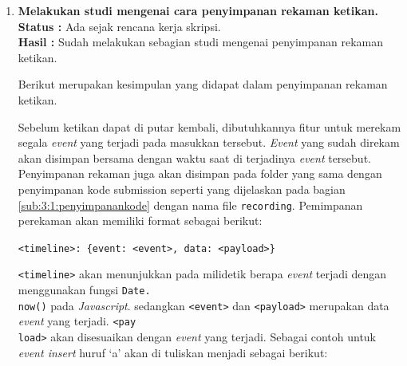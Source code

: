 \documentclass[a4paper,twoside]{article}
\begin{document}
\begin{enumerate}
	      \begin{lstlisting}[language={php}, caption={Contoh template Twig}, label={kode:2:twig}]
{% extends "base.html" %}
{% block navigation %}
	<ul id="navigation">
	{% for item in navigation %}
		<li>
			<a href="{{item.href}}">
				{% if item.level == 2 %}&nbsp;&nbsp;{% endif %}
				{{ item.caption|upper }}
			</a>
		</li>
	{% endfor %}
	</ul>
{% endblock navigation %}
			\end{lstlisting}

	      Kode \ref{kode:2:twig} merupakan contoh sebuah template Twig. Terdapat dua jenis \textit{delimiter}, yaitu \verb|{% ... %}| dan \verb|{{ ... }}|. \textit{Delimiter} \verb|{% ... %}| digunakan untuk Menjalankan sebuah \textit{statement} seperti \textit{for-loops}, sedangkan \textit{delimiter} \verb|{{ ... }}| digunakan untuk mengubah sebuah \textit{variable} atau \textit{expression} menjadi sebuah html biasa dengan nilai \textit{variable} atau \textit{expression} tersebut.


	\item \textbf{Melakukan studi mengenai cara penyimpanan rekaman ketikan.} \\
	      {\bf Status :} Ada sejak rencana kerja skripsi.\\
	      {\bf Hasil :} Sudah melakukan sebagian studi mengenai penyimpanan rekaman ketikan.

	      Berikut merupakan kesimpulan yang didapat dalam penyimpanan rekaman ketikan.

	      Sebelum ketikan dapat di putar kembali, dibutuhkannya fitur untuk merekam segala \textit{event} yang terjadi pada masukkan tersebut. \textit{Event} yang sudah direkam akan disimpan bersama dengan waktu saat di terjadinya \textit{event} tersebut. Penyimpanan rekaman juga akan disimpan pada folder yang sama dengan penyimpanan kode submission seperti yang dijelaskan pada bagian \ref{sub:3:1:penyimpanankode} dengan nama file \verb|recording|. Pemimpanan perekaman akan memiliki format sebagai berikut:

	      \begin{center}
		      \verb|<timeline>: {event: <event>, data: <payload>}|
	      \end{center}

	      \verb|<timeline>| akan menunjukkan pada milidetik berapa \textit{event} terjadi dengan menggunakan fungsi \verb|Date.| \\ \verb|now()| pada \textit{Javascript}. sedangkan \verb|<event>| dan \verb|<payload>| merupakan data \textit{event} yang terjadi. \verb|<pay| \\ \verb|load>| akan disesuaikan dengan \textit{event} yang terjadi. Sebagai contoh untuk \textit{event insert} huruf `a' akan di tuliskan menjadi sebagai berikut:


\end{enumerate}
\end{document}

